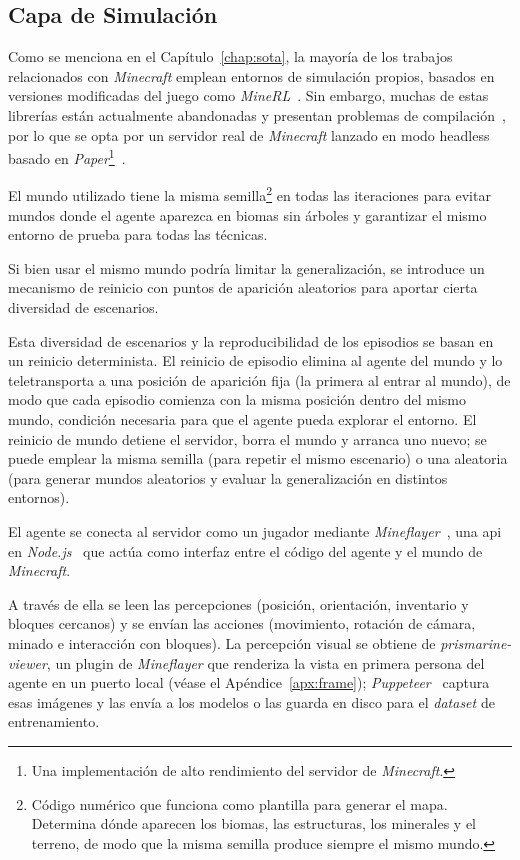 \subsection{Capa de Simulación}
Como se menciona en el Capítulo~\ref{chap:sota}, la mayoría de los trabajos
relacionados con \textit{Minecraft} emplean entornos de simulación propios, basados en versiones
modificadas del juego como \textit{MineRL}~\cite{guss2019minerl}. Sin embargo, muchas
de estas librerías están actualmente abandonadas y presentan problemas de
compilación~\cite{minerl_issue788}, por lo que se opta por un servidor real de
\textit{Minecraft} lanzado en modo \gls{headless} basado en \textit{Paper}\footnote{Una implementación de alto rendimiento del
servidor de \textit{Minecraft}.}~\cite{papermc}.

El mundo utilizado tiene la misma \gls{semilla}\footnote{Código numérico que funciona como plantilla para generar el mapa. Determina dónde
aparecen los biomas, las estructuras, los minerales y el terreno, de modo que la misma \gls{semilla} produce
siempre el mismo mundo.} en todas las iteraciones para evitar mundos donde el agente aparezca en \glspl{bioma} sin árboles
y garantizar el mismo entorno de prueba para todas las técnicas.

Si bien usar el mismo mundo podría limitar la generalización,
se introduce un mecanismo de reinicio con puntos de aparición aleatorios para aportar cierta diversidad de escenarios.

Esta diversidad de escenarios y la reproducibilidad de los episodios se basan en un
reinicio determinista. El reinicio de episodio elimina al agente del mundo y lo teletransporta
a una posición de aparición fija (la primera al entrar al mundo), de modo que cada episodio comienza
con la misma posición dentro del mismo mundo, condición necesaria para que el agente pueda explorar el entorno.
El reinicio de mundo detiene el servidor, borra el mundo y arranca uno nuevo; se puede emplear la misma \gls{semilla}
(para repetir el mismo escenario) o una aleatoria (para generar mundos aleatorios y evaluar la
generalización en distintos entornos).

El agente se conecta al servidor como un jugador mediante
\textit{Mineflayer}~\cite{mineflayer}, una \acrshort{api} en \textit{Node.js}~\cite{nodejs} que
actúa como interfaz entre el código del agente y el mundo de \textit{Minecraft}.

A través de ella se leen las percepciones (posición, orientación,
inventario y bloques cercanos) y se envían las acciones (movimiento,
rotación de cámara, minado e interacción con bloques). La percepción visual
se obtiene de \textit{prismarine-viewer}, un plugin de \textit{Mineflayer} que
renderiza la vista en primera persona del agente en un puerto local (véase el Apéndice~\ref{apx:frame});
\textit{Puppeteer}~\cite{puppeteer} captura esas imágenes y las envía a los
modelos o las guarda en disco para el \textit{dataset} de entrenamiento.

